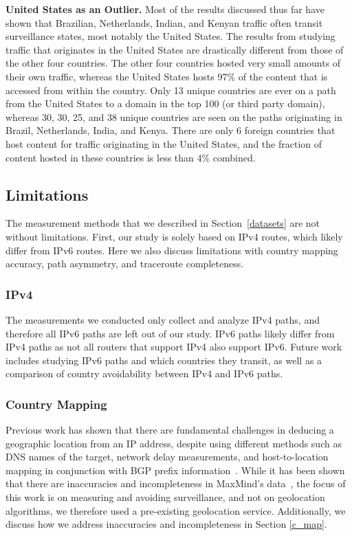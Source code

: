 {\bf United States as an Outlier.}
Most of the results discussed thus far have shown that Brazilian, Netherlands, Indian, and Kenyan traffic often transit surveillance states, most notably the United States.  The results from studying traffic that originates in the United States are drastically different from those of the other four countries.  The other four countries hosted very small amounts of their own traffic, whereas the United States hosts 97\% of the content that is accessed from within the country.  Only 13 unique countries are ever on a path from the United States to a domain in the top 100 (or third party domain), whereas 30, 30, 25, and 38 unique countries are seen on the paths originating in Brazil, Netherlands, India, and Kenya.  There are only 6 foreign countries that host content for traffic originating in the United States, and the fraction of content hosted in these countries is less than 4\% combined.

\subsection{Limitations}
The measurement methods that we described in Section~\ref{datasets} are not without limitations.  First, our study is solely based on IPv4 routes, which likely differ from IPv6 routes.  Here we also discuss limitations with country mapping accuracy, path asymmetry, and traceroute completeness.

\subsubsection{IPv4}
The measurements we conducted only collect and analyze IPv4 paths, and therefore all IPv6 paths are left out of our study.  IPv6 paths likely differ from IPv4 paths as not all routers that support IPv4 also support IPv6.  Future work includes studying IPv6 paths and which countries they transit, as well as a comparison of country avoidability between IPv4 and IPv6 paths. 

\subsubsection{Country Mapping}
Previous work has shown that there are fundamental challenges in deducing a geographic location from an IP address, despite using different methods such as DNS names of the target, network delay measurements, and host-to-location mapping in conjunction with BGP prefix information~\cite{padmanabhan2001investigation}.  While it has been shown that there are inaccuracies and incompleteness in MaxMind's data~\cite{huffaker2011geocompare}, the focus of this work is on measuring and avoiding surveillance, and not on geolocation algorithms, we therefore used a pre-existing geolocation service. Additionally, we discuss how we address inaccuracies and incompleteness in Section \ref{c_map}.


